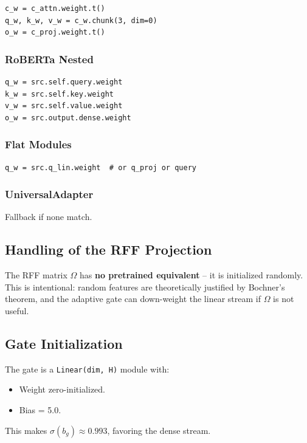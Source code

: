 \begin{lstlisting}
c_w = c_attn.weight.t()
q_w, k_w, v_w = c_w.chunk(3, dim=0)
o_w = c_proj.weight.t()
\end{lstlisting}

\subsubsection{RoBERTa Nested}

\begin{lstlisting}
q_w = src.self.query.weight
k_w = src.self.key.weight
v_w = src.self.value.weight
o_w = src.output.dense.weight
\end{lstlisting}

\subsubsection{Flat Modules}

\begin{lstlisting}
q_w = src.q_lin.weight  # or q_proj or query
\end{lstlisting}

\subsubsection{UniversalAdapter}

Fallback if none match.

\subsection{Handling of the RFF Projection}

The RFF matrix $\Omega$ has \textbf{no pretrained equivalent} -- it is initialized 
randomly. This is intentional: random features are theoretically justified 
by Bochner's theorem, and the adaptive gate can down-weight the linear 
stream if $\Omega$ is not useful.

\subsection{Gate Initialization}

The gate is a \texttt{Linear(dim, H)} module with:

\begin{itemize}
\item Weight zero-initialized.
\item Bias = 5.0.

\end{itemize}
This makes $\sigma(b_g) \approx 0.993$, favoring the dense stream.

